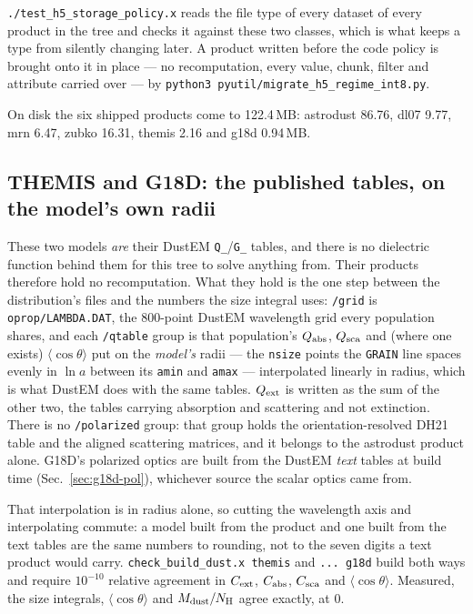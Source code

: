 \documentclass{my_memo}
\newcommand{\code}[1]{\texttt{#1}}
\begin{document}
\code{./test\_h5\_storage\_policy.x} reads the file type of every dataset of
every product in the tree and checks it against these two classes, which is what
keeps a type from silently changing later. A product written before the code
policy is brought onto it in place --- no recomputation, every value, chunk,
filter and attribute carried over --- by
\code{python3 pyutil/migrate\_h5\_regime\_int8.py}.

On disk the six shipped products come to 122.4\,MB: astrodust 86.76, dl07 9.77, mrn 6.47, zubko 16.31,
themis 2.16 and g18d 0.94\,MB.

\subsection{THEMIS and G18D: the published tables, on the model's own
radii}\label{sec:dustemproducts}

These two models \emph{are} their DustEM \code{Q\_}/\code{G\_} tables, and there
is no dielectric function behind them for this tree to solve anything from. Their
products therefore hold no recomputation. What they hold is the one step between
the distribution's files and the numbers the size integral uses: \code{/grid} is
\code{oprop/LAMBDA.DAT}, the 800-point DustEM wavelength grid every population
shares, and each \code{/qtable} group is that population's $Q_{\rm abs}$,
$Q_{\rm sca}$ and (where one exists) $\langle\cos\theta\rangle$ put on the
\emph{model's} radii --- the \code{nsize} points the \code{GRAIN} line spaces
evenly in $\ln a$ between its \code{amin} and \code{amax} --- interpolated
linearly in radius, which is what DustEM does with the same tables.
$Q_{\rm ext}$ is written as the sum of the other two, the tables carrying
absorption and scattering and not extinction. There is no \code{/polarized}
group: that group holds the orientation-resolved DH21 table and the aligned
scattering matrices, and it belongs to the astrodust product alone. G18D's
polarized optics are built from the DustEM \emph{text} tables at build time
(Sec.~\ref{sec:g18d-pol}), whichever source the scalar optics came from.

That interpolation is in radius alone, so cutting the wavelength axis and
interpolating commute: a model built from the product and one built from the
text tables are the same numbers to rounding, not to the seven digits a text
product would carry. \code{check\_build\_dust.x themis} and \code{... g18d}
build both ways and require $10^{-10}$ relative agreement in $C_{\rm ext}$,
$C_{\rm abs}$, $C_{\rm sca}$ and $\langle\cos\theta\rangle$. Measured, the size
integrals, $\langle\cos\theta\rangle$ and $M_{\rm dust}/N_{\rm H}$ agree
exactly, at $0$.
\end{document}
